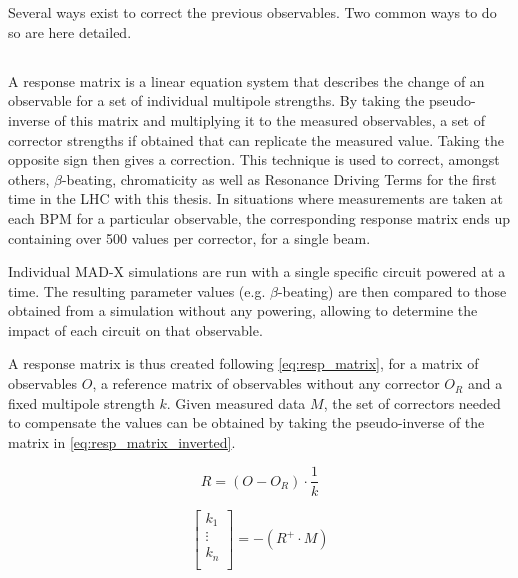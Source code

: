 \section{}

Several ways exist to correct the previous observables. Two common ways to do so are here detailed.

\subsection{}
\label{correction_principle:response_matrix}

A response matrix is a linear equation system that describes the change of an observable for a set
of individual multipole strengths. By taking the pseudo-inverse of this matrix and multiplying it to
the measured observables, a set of corrector strengths if obtained that can replicate the measured
value. Taking the opposite sign then gives a correction. This technique is used to correct, amongst
others, $\beta$-beating, chromaticity as well as Resonance Driving Terms for the first time in the
LHC with this thesis. In situations where measurements are taken at each BPM for a particular
observable, the corresponding response matrix ends up containing over 500 values per corrector, for
a single beam.

Individual MAD-X simulations are run with a single specific circuit powered at a time. The resulting
parameter values (e.g. $\beta$-beating) are then compared to those obtained from a simulation
without any powering, allowing to determine the impact of each circuit on that observable.

A response matrix is thus created following \cref{eq:resp_matrix}, for a matrix of observables
$O$, a reference matrix of observables without any corrector $O_R$ and a fixed multipole strength
$k$. Given measured data $M$, the set of correctors needed to compensate the values can be obtained
by taking the pseudo-inverse of the matrix in \cref{eq:resp_matrix_inverted}.

\begin{equation}
  R = \left(O - O_R \right) \cdot \frac{1}{k}
  \label{eq:resp_matrix}
\end{equation}

\begin{equation}
  \begin{bmatrix}
    k_1 \\
    \vdots \\
    k_n \\
  \end{bmatrix}
  = -(R^{+} \cdot M)
  \label{eq:resp_matrix_inverted}
\end{equation}
 
